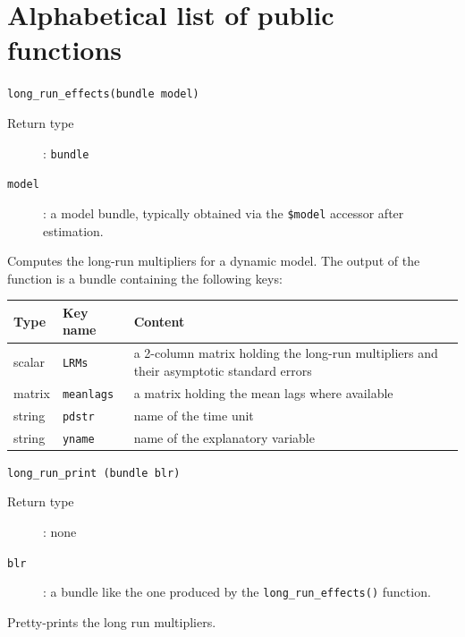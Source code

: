 \documentclass[a4paper,10pt]{article}
\newenvironment{funcdoc}[1]
{\noindent\hrulefill\newline\texttt{#1}\par\noindent\hrulefill\par\medskip\par}
{\bigskip}
\begin{document}
\section{Alphabetical list of public functions}
 \label{sec:functions}


\begin{funcdoc}{long\_run\_effects(bundle model)}
  \begin{description}
  \item[Return type]: \texttt{bundle}
  \item[\texttt{model}]: a model bundle, typically obtained via the
    \verb|$model| accessor after estimation.
\end{description}
%

\noindent Computes the long-run multipliers for a dynamic model. The
output of the function is a bundle containing the following keys:

\medskip
\begin{center}
\begin{tabular}{llp{}}
  \hline
  \textbf{Type} & \textbf{Key name} & \textbf{Content} \\
  \hline
  scalar & \texttt{LRMs} & a 2-column matrix holding the long-run multipliers
                           and their asymptotic standard errors \\ 
  matrix & \texttt{meanlags} & a matrix holding the mean lags where available \\ 
  string & \texttt{pdstr} & name of the time unit \\ 
  string & \texttt{yname} & name of the explanatory variable \\ 
  \hline
\end{tabular}
\end{center}
\end{funcdoc}

\begin{funcdoc}{long\_run\_print (bundle blr)}
  \begin{description}
  \item[Return type]: none
  \item[\texttt{blr}]: a bundle like the one produced by the
    \texttt{long\_run\_effects()} function.
\end{description}

\noindent Pretty-prints the long run multipliers.
\end{funcdoc}
\end{document}
